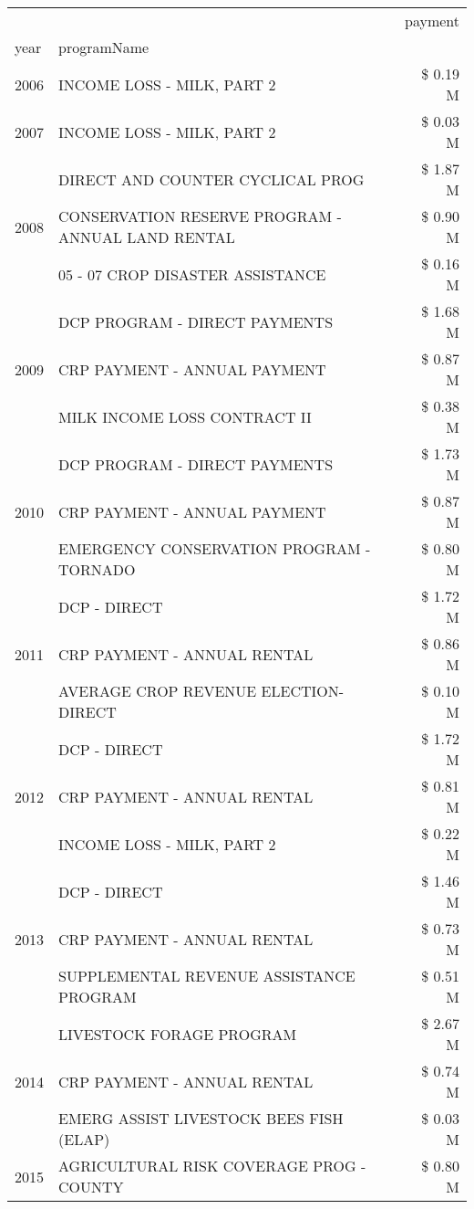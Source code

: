 \begin{tabular}{llr}
\toprule
 &  & payment \\
year & programName &  \\
\midrule
2006 & INCOME LOSS - MILK, PART 2 & \$ 0.19 M \\
\cline{1-3}
2007 & INCOME LOSS - MILK, PART 2 & \$ 0.03 M \\
\cline{1-3}
\multirow[t]{3}{*}{2008} & DIRECT AND COUNTER CYCLICAL PROG & \$ 1.87 M \\
 & CONSERVATION RESERVE PROGRAM - ANNUAL LAND RENTAL & \$ 0.90 M \\
 & 05 - 07 CROP DISASTER ASSISTANCE & \$ 0.16 M \\
\cline{1-3}
\multirow[t]{3}{*}{2009} & DCP PROGRAM - DIRECT PAYMENTS & \$ 1.68 M \\
 & CRP PAYMENT - ANNUAL PAYMENT & \$ 0.87 M \\
 & MILK INCOME LOSS CONTRACT II & \$ 0.38 M \\
\cline{1-3}
\multirow[t]{3}{*}{2010} & DCP PROGRAM - DIRECT PAYMENTS & \$ 1.73 M \\
 & CRP PAYMENT - ANNUAL PAYMENT & \$ 0.87 M \\
 & EMERGENCY CONSERVATION PROGRAM - TORNADO & \$ 0.80 M \\
\cline{1-3}
\multirow[t]{3}{*}{2011} & DCP - DIRECT & \$ 1.72 M \\
 & CRP PAYMENT - ANNUAL RENTAL & \$ 0.86 M \\
 & AVERAGE CROP REVENUE ELECTION-DIRECT & \$ 0.10 M \\
\cline{1-3}
\multirow[t]{3}{*}{2012} & DCP - DIRECT & \$ 1.72 M \\
 & CRP PAYMENT - ANNUAL RENTAL & \$ 0.81 M \\
 & INCOME LOSS - MILK, PART 2 & \$ 0.22 M \\
\cline{1-3}
\multirow[t]{3}{*}{2013} & DCP - DIRECT & \$ 1.46 M \\
 & CRP PAYMENT - ANNUAL RENTAL & \$ 0.73 M \\
 & SUPPLEMENTAL REVENUE ASSISTANCE PROGRAM & \$ 0.51 M \\
\cline{1-3}
\multirow[t]{3}{*}{2014} & LIVESTOCK FORAGE PROGRAM & \$ 2.67 M \\
 & CRP PAYMENT - ANNUAL RENTAL & \$ 0.74 M \\
 & EMERG ASSIST LIVESTOCK BEES FISH (ELAP) & \$ 0.03 M \\
\cline{1-3}
\multirow[t]{3}{*}{2015} & AGRICULTURAL RISK COVERAGE PROG - COUNTY & \$ 0.80 M \\

\end{tabular}
